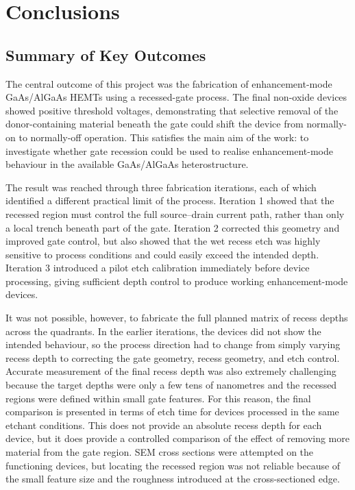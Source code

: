 \chapter{Conclusions}
\label{ch:conclusions}

\section{Summary of Key Outcomes}

The central outcome of this project was the fabrication of enhancement-mode
GaAs/AlGaAs HEMTs using a recessed-gate process. The final non-oxide devices
showed positive threshold voltages, demonstrating that selective removal of the
donor-containing material beneath the gate could shift the device from
normally-on to normally-off operation. This satisfies the main aim of the work:
to investigate whether gate recession could be used to realise
enhancement-mode behaviour in the available GaAs/AlGaAs heterostructure.

\vspace{1mm}

The result was reached through three fabrication iterations, each of which
identified a different practical limit of the process. Iteration 1 showed that
the recessed region must control the full source--drain current path, rather
than only a local trench beneath part of the gate. Iteration 2 corrected this
geometry and improved gate control, but also showed that the wet recess etch was
highly sensitive to process conditions and could easily exceed the intended
depth. Iteration 3 introduced a pilot etch calibration immediately before
device processing, giving sufficient depth control to produce working
enhancement-mode devices.

\vspace{1mm}

It was not possible, however, to fabricate the full planned matrix of recess
depths across the quadrants. In the earlier iterations, the devices did not
show the intended behaviour, so the process direction had to change from simply
varying recess depth to correcting the gate geometry, recess geometry, and etch
control. Accurate measurement of the final recess depth was also extremely
challenging because the target depths were only a few tens of nanometres and the
recessed regions were defined within small gate features. For this reason, the
final comparison is presented in terms of etch time for devices processed in
the same etchant conditions. This does not provide an absolute recess depth for
each device, but it does provide a controlled comparison of the effect of
removing more material from the gate region. SEM cross sections were attempted
on the functioning devices, but locating the recessed region was not reliable
because of the small feature size and the roughness introduced at the
cross-sectioned edge.


